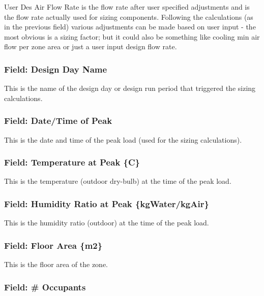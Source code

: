 User Des Air Flow Rate is the flow rate after user specified adjustments and is the flow rate actually used for sizing components. Following the calculations (as in the previous field) various adjustments can be made based on user input - the most obvious is a sizing factor; but it could also be something like cooling min air flow per zone area or just a user input design flow rate.

\subsubsection{Field: Design Day Name}\label{field-design-day-name}

This is the name of the design day or design run period that triggered the sizing calculations.

\subsubsection{Field: Date/Time of Peak}\label{field-datetime-of-peak}

This is the date and time of the peak load (used for the sizing calculations).

\subsubsection{Field: Temperature at Peak \{C\}}\label{field-temperature-at-peak-c}

This is the temperature (outdoor dry-bulb) at the time of the peak load.

\subsubsection{Field: Humidity Ratio at Peak \{kgWater/kgAir\}}\label{field-humidity-ratio-at-peak-kgwaterkgair}

This is the humidity ratio (outdoor) at the time of the peak load.

\subsubsection{Field: Floor Area \{m2\}}\label{field-floor-area-m2-2}

This is the floor area of the zone.

\subsubsection{Field: \# Occupants}\label{field-occupants-1}

